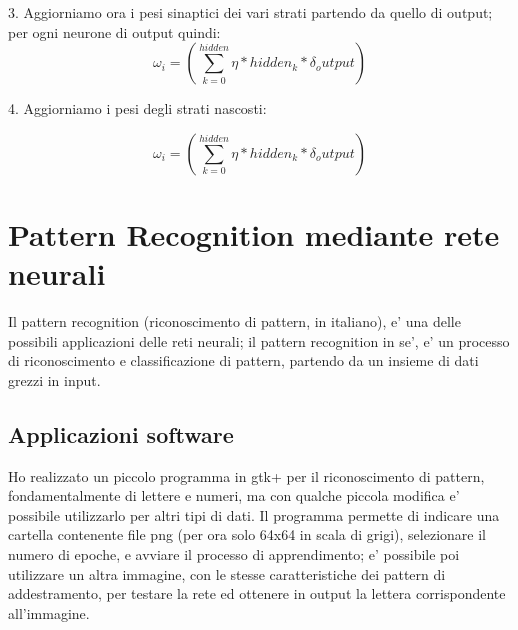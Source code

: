 \documentclass[a4paper,10pt]{book}
\begin{document}
3.
Aggiorniamo ora i pesi sinaptici dei vari strati partendo da quello di 
output; per ogni neurone di output quindi:
\[
 \omega_i = (\sum_{k=0}^{hidden} \eta * hidden_k * \delta_output)
\]



4.
Aggiorniamo i pesi degli strati nascosti:	

\[
 \omega_i = (\sum_{k=0}^{hidden} \eta * hidden_k * \delta_output)
\]




\section{Pattern Recognition mediante rete neurali}
Il pattern recognition (riconoscimento di pattern, in italiano), 
e' una delle possibili applicazioni delle reti neurali; 
il pattern recognition in se', e' un processo di 
riconoscimento e classificazione di pattern, partendo
da un insieme di dati grezzi in input.

\subsection{Applicazioni software}
Ho realizzato un piccolo programma in gtk+ per il riconoscimento
di pattern, fondamentalmente di lettere e numeri, ma con qualche
piccola modifica e' possibile utilizzarlo per altri tipi di dati.
Il programma permette di indicare una cartella contenente file png
(per ora solo 64x64 in scala di grigi), selezionare il numero di epoche, 
e avviare il processo di apprendimento; e' possibile poi utilizzare un altra 
immagine, con le stesse caratteristiche dei pattern di addestramento, 
per testare la rete ed ottenere in output la lettera corrispondente all'immagine. 
\end{document}
